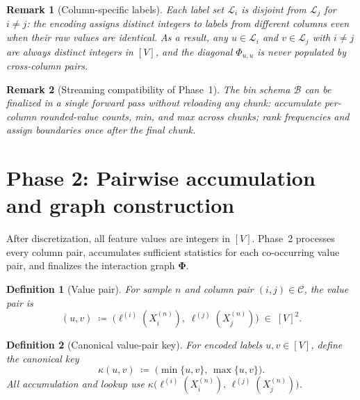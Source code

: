 \documentclass[11pt]{article}
\newtheorem{definition}{Definition}
\newtheorem{remark}{Remark}
\begin{document}
\begin{remark}[Column-specific labels]
\label{rem:col-specific}
Each label set $\mathcal{L}_i$ is disjoint from $\mathcal{L}_j$ for $i \neq j$: the encoding assigns distinct integers to labels from different columns even when their raw values are identical.
As a result, any $u \in \mathcal{L}_i$ and $v \in \mathcal{L}_j$ with $i \neq j$ are always distinct integers in $[V]$, and the diagonal $\Phi_{u,u}$ is never populated by cross-column pairs.
\end{remark}

\begin{remark}[Streaming compatibility of Phase~1]
\label{rem:stream-phase1}
The bin schema $\mathcal{B}$ can be finalized in a single forward pass without reloading any chunk: accumulate per-column rounded-value counts, min, and max across chunks; rank frequencies and assign boundaries once after the final chunk.
\end{remark}

\section{Phase 2: Pairwise accumulation and graph construction}
\label{sec:accumulate}
\label{sec:graph}

After discretization, all feature values are integers in $[V]$.
Phase~2 processes every column pair, accumulates sufficient statistics for each co-occurring value pair, and finalizes the interaction graph $\bm{\Phi}$.

\begin{definition}[Value pair]
\label{def:value-pair}
For sample $n$ and column pair $(i,j) \in \mathcal{C}$, the \emph{value pair} is
\[
  (u,v) \;\coloneqq\; \bigl(\ell^{(i)}(X_i^{(n)}),\; \ell^{(j)}(X_j^{(n)})\bigr) \;\in\; [V]^2.
\]
\end{definition}

\begin{definition}[Canonical value-pair key]
\label{def:canonical-key}
For encoded labels $u,v \in [V]$, define the \emph{canonical key}
\[
  \kappa(u,v) \;\coloneqq\; \bigl(\min\{u,v\},\,\max\{u,v\}\bigr).
\]
All accumulation and lookup use $\kappa\bigl(\ell^{(i)}(X_i^{(n)}),\,\ell^{(j)}(X_j^{(n)})\bigr)$.
\end{definition}
\end{document}
